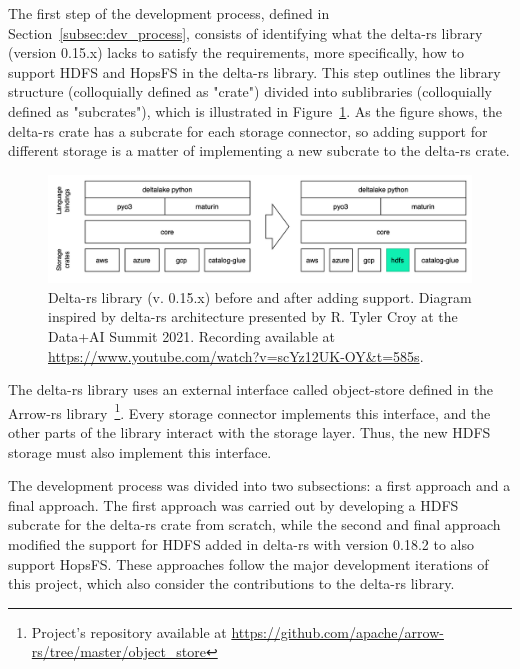 
The first step of the development process, defined in Section~\ref{subsec:dev_process}, consists of identifying what the delta-rs library (version 0.15.x) lacks to satisfy the requirements, more specifically, how to support \gls{HDFS} and \gls{HopsFS} in the delta-rs library. This step outlines the library structure (colloquially defined as "crate") divided into sublibraries (colloquially defined as "subcrates"), which is illustrated in Figure~\ref{fig:delta-rs_schema}. As the figure shows, the delta-rs crate has a subcrate for each storage connector, so adding support for different storage is a matter of implementing a new subcrate to the delta-rs crate.

\begin{figure}[!ht]
    \begin{center}
      \includegraphics[width=\textwidth]{figures/4-implementation/delta-rs_schema.png}
    \caption[Delta-rs architecture before and after implementation]{Delta-rs library (v. 0.15.x) before and after adding  support. Diagram inspired by delta-rs architecture presented by R. Tyler Croy at the Data+AI Summit 2021. Recording available at \url{https://www.youtube.com/watch?v=scYz12UK-OY&t=585s}.}
    \label{fig:delta-rs_schema}
    \end{center}
\end{figure}

The delta-rs library uses an external interface called object-store defined in the Arrow-rs library~\footnote{Project's repository available at \url{https://github.com/apache/arrow-rs/tree/master/object_store}}. Every storage connector implements this interface, and the other parts of the library interact with the storage layer. Thus, the new \gls{HDFS} storage must also implement this interface.

The development process was divided into two subsections: a first approach and a final approach. The first approach was carried out by developing a \gls{HDFS} subcrate for the delta-rs crate from scratch, while the second and final approach modified the support for \gls{HDFS} added in delta-rs with version 0.18.2 to also support \gls{HopsFS}. These approaches follow the major development iterations of this project, which also consider the contributions to the delta-rs library.

